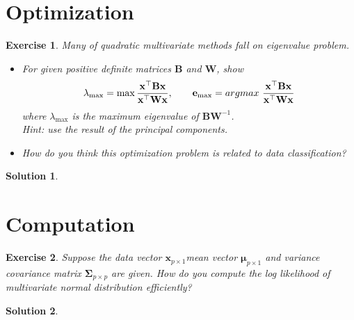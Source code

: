 \documentclass[12pt,a4paper]{article}
\def \t {^\top}
\def \x {\mathbf x}
\def \argmax {\mathrm {argmax}~}
\newtheorem{exercise}{Exercise}
\numberwithin{exercise}{section} %
\newtheorem{solution}{Solution}
\numberwithin{solution}{section} %
\begin{document}
\section{Optimization}
\begin{exercise}
Many of quadratic multivariate methods fall on eigenvalue problem.
\begin{itemize}
\item For given positive definite matrices $\mathbf B$ and $\mathbf W$, show 
$$ \lambda_\mathrm{max}=\max {\mathbf x\t \mathbf B \mathbf x \over \mathbf x\t \mathbf W \mathbf x}, \quad\quad\mathbf{e}_{\mathrm{max}}=\mathbf \argmax {\mathbf x\t \mathbf B \mathbf x \over \mathbf x\t \mathbf W \mathbf x}  $$  
where $\lambda_{\mathrm {max}}$ is the maximum eigenvalue of $\mathbf B\mathbf W^{-1}$. \\
    Hint: use the result of the principal components. 

\item How do you think this optimization problem is related to data classification? 
\end{itemize}
\end{exercise}
\begin{solution}
\end{solution}


\section{Computation}
\begin{exercise}
Suppose the data vector $\x_{p\times 1}$mean vector $\boldsymbol \mu_{p\times 1}$ and variance covariance matrix $\boldsymbol \Sigma_{p\times p}$ are given. How do you compute the log likelihood of multivariate normal distribution  efficiently? \\
\end{exercise}
\begin{solution}
\end{solution}



\newpage
\end{document}
